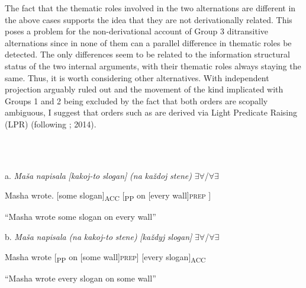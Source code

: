\documentclass[output=paper,modfonts, nonflat]{langsci/langscibook}
\begin{document}
\begin{styleinnerExample}
The fact that the thematic roles involved in the two alternations are different in the above cases supports the idea that they are not derivationally related. This poses a problem for the non-derivational account of Group 3 ditransitive alternations since in none of them can a parallel difference in thematic roles be detected. The only differences seem to be related to the information structural status of the two internal arguments, with their thematic roles always staying the same. Thus, it is worth considering other alternatives. With independent projection arguably ruled out and the movement of the kind implicated with Groups 1 and 2 being excluded by the fact that both orders are scopally ambiguous, I suggest that orders such as  are derived via Light Predicate Raising (LPR) (following \citealt{Larson1989}; 2014).

\begin{styleinnerExample}
\ea%
    \label{ex:key:59}
    \gll\\
        \\
    \glt
    \z

          a.  \textit{Maša}  \textit{napisala} \textit{[kakoj-to} \textit{slogan]}         \textit{(na} \textit{každoj} \textit{stene)} ${\exists}{\forall}$/${\forall}{\exists}$
\end{styleinnerExample}

\begin{styleinnerExample}
    Masha wrote.    [some     slogan]\textsubscript{ACC} [\textsubscript{PP} on [every wall]\textsc{prep} ]
\end{styleinnerExample}

\begin{styleinnerExample}
    “Masha wrote some slogan on every wall”
\end{styleinnerExample}

\begin{styleinnerExample}
  b.  \textit{Maša} \textit{napisala}  \textit{(na}  \textit{kakoj-to} \textit{stene)}        \textit{[každyj} \textit{slogan]}  ${\exists}{\forall}$/${\forall}{\exists}$
\end{styleinnerExample}

\begin{styleinnerExample}
    Masha wrote [\textsubscript{PP} on [some     wall]\textsc{prep}] [every slogan]\textsubscript{ACC}
\end{styleinnerExample}

\begin{styleinnerExample}
    “Masha wrote every slogan on some wall”
\end{styleinnerExample}


\end{styleinnerExample}
\end{document}
